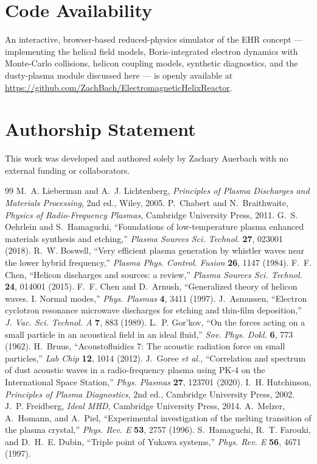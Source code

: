 \documentclass[11pt]{article}
\begin{document}
\section*{Code Availability}
An interactive, browser-based reduced-physics simulator of the EHR concept --- implementing the helical field models, Boris-integrated electron dynamics with Monte-Carlo collisions, helicon coupling models, synthetic diagnostics, and the dusty-plasma module discussed here --- is openly available at \url{https://github.com/ZachBach/ElectromagneticHelixReactor}.

\section*{Authorship Statement}
This work was developed and authored solely by Zachary Auerbach with no external funding or collaborators.

\begin{thebibliography}{99}
 M.~A. Lieberman and A.~J. Lichtenberg, \textit{Principles of Plasma Discharges and Materials Processing}, 2nd ed., Wiley, 2005.
 P.~Chabert and N.~Braithwaite, \textit{Physics of Radio-Frequency Plasmas}, Cambridge University Press, 2011.
 G.~S. Oehrlein and S.~Hamaguchi, ``Foundations of low-temperature plasma enhanced materials synthesis and etching,'' \textit{Plasma Sources Sci. Technol.} \textbf{27}, 023001 (2018).
 R.~W. Boswell, ``Very efficient plasma generation by whistler waves near the lower hybrid frequency,'' \textit{Plasma Phys. Control. Fusion} \textbf{26}, 1147 (1984).
 F.~F. Chen, ``Helicon discharges and sources: a review,'' \textit{Plasma Sources Sci. Technol.} \textbf{24}, 014001 (2015).
 F.~F. Chen and D.~Arnush, ``Generalized theory of helicon waves. I. Normal modes,'' \textit{Phys. Plasmas} \textbf{4}, 3411 (1997).
 J.~Asmussen, ``Electron cyclotron resonance microwave discharges for etching and thin-film deposition,'' \textit{J. Vac. Sci. Technol. A} \textbf{7}, 883 (1989).
 L.~P. Gor'kov, ``On the forces acting on a small particle in an acoustical field in an ideal fluid,'' \textit{Sov. Phys. Dokl.} \textbf{6}, 773 (1962).
 H.~Bruus, ``Acoustofluidics 7: The acoustic radiation force on small particles,'' \textit{Lab Chip} \textbf{12}, 1014 (2012).
 J.~Goree \textit{et al.}, ``Correlation and spectrum of dust acoustic waves in a radio-frequency plasma using PK-4 on the International Space Station,'' \textit{Phys. Plasmas} \textbf{27}, 123701 (2020).
 I.~H. Hutchinson, \textit{Principles of Plasma Diagnostics}, 2nd ed., Cambridge University Press, 2002.
 J.~P. Freidberg, \textit{Ideal MHD}, Cambridge University Press, 2014.
 A.~Melzer, A.~Homann, and A.~Piel, ``Experimental investigation of the melting transition of the plasma crystal,'' \textit{Phys. Rev. E} \textbf{53}, 2757 (1996).
 S.~Hamaguchi, R.~T. Farouki, and D.~H.~E. Dubin, ``Triple point of Yukawa systems,'' \textit{Phys. Rev. E} \textbf{56}, 4671 (1997).
\end{thebibliography}
\end{document}
